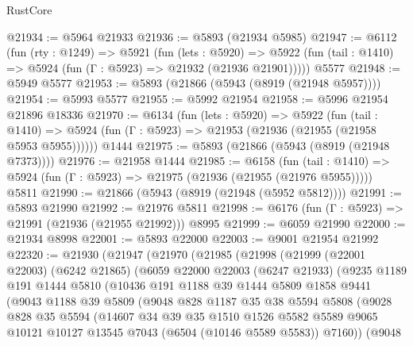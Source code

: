 \begin{lexlean}{RustCore}
\begin{coremodule}
@21934 := @5964 @21933
@21936 := @5893 (@21934 @5985)
@21947 := @6112
    (fun (rty : @1249) =>
    @5921
      (fun (lets : @5920) =>
      @5922 (fun (tail : @1410) => @5924 (fun (Γ : @5923) => @21932 (@21936 @21901)))))
    @5577
@21948 := @5949 @5577
@21953 := @5893 (@21866 (@5943 (@8919 (@21948 @5957))))
@21954 := @5993 @5577
@21955 := @5992 @21954
@21958 := @5996 @21954 @21896 @18336
@21970 := @6134
    (fun (lets : @5920) =>
    @5922
      (fun (tail : @1410) =>
      @5924 (fun (Γ : @5923) => @21953 (@21936 (@21955 (@21958 @5953 @5955))))))
    @1444
@21975 := @5893 (@21866 (@5943 (@8919 (@21948 @7373))))
@21976 := @21958 @1444
@21985 := @6158
    (fun (tail : @1410) => @5924 (fun (Γ : @5923) => @21975 (@21936 (@21955 (@21976 @5955)))))
    @5811
@21990 := @21866 (@5943 (@8919 (@21948 (@5952 @5812))))
@21991 := @5893 @21990
@21992 := @21976 @5811
@21998 := @6176 (fun (Γ : @5923) => @21991 (@21936 (@21955 @21992))) @8995
@21999 := @6059 @21990
@22000 := @21934 @8998
@22001 := @5893 @22000
@22003 := @9001 @21954 @21992
@22320 := @21930
    (@21947
      (@21970
        (@21985
          (@21998
            (@21999
              (@22001 @22003)
              (@6242 @21865)
              (@6059
                @22000
                @22003
                (@6247 @21933)
                (@9235
                  @1189
                  @191
                  @1444
                  @5810
                  (@10436
                    @191
                    @1188
                    @39
                    @1444
                    @5809
                    @1858
                    @9441
                    (@9043
                      @1188
                      @39
                      @5809
                      (@9048
                        @828
                        @1187
                        @35
                        @38
                        @5594
                        @5808
                        (@9028
                          @828
                          @35
                          @5594
                          (@14607
                            @34
                            @39
                            @35
                            @1510
                            @1526
                            @5582
                            @5589
                            @9065
                            @10121
                            @10127
                            @13545
                            @7043
                            (@6504 (@10146 @5589 @5583))
                            @7160))
                        (@9048

\end{coremodule}
\end{lexlean}
